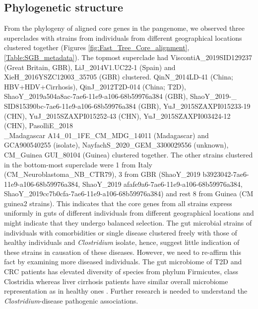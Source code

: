 \documentclass[11pt]{article}
\begin{document}
\subsection{Phylogenetic structure}
From the phylogeny of aligned core genes in the pangenome, we observed three superclades with strains from individuals from different geographical locations clustered together (Figures \ref{fig:Fast_Tree_Core_alignment},\ref{Table:SGB_metadata}). The topmost superclade had 
ViscontiA\_2019SID129237 (Great Britain, GBR), LiJ\_2014V1.UC22-1 (Spain) and XieH\_2016YSZC12003\_35705 (GBR) clustered. QinN\_2014LD-41 (China; HBV+HDV+Cirrhosis), QinJ\_2012T2D-014 (China; T2D), ShaoY\_2019a504a8ac-7ae6-11e9-a106-68b59976a384 (GBR), ShaoY\_2019-\_\\ SID815390bc-7ae6-11e9-a106-68b59976a384 (GBR), YuJ\_2015SZAXPI015233-19 (CHN), YuJ\_2015SZAXPI015252-43 (CHN), YuJ\_2015SZAXPI003424-12 (CHN), PasolliE\_2018\ \\ \_Madagascar      A14\_01\_1FE\_CM\_MDG\_14011 (Madagascar) and GCA900540255 (isolate), NayfachS\_2020\_GEM\_3300029556 (unknown), CM\_Guinea GUI\_80104 (Guinea) clustered together. The other strains clustered in the bottom-most superclade were 1 from Italy (CM\_Neuroblastoma\_NB\_CTR79), 3 from GBR (ShaoY\_2019 b3923042-7ae6-11e9-a106-68b59976a384, ShaoY\_2019 afafe9a6-7ae6-11e9-a106-68b59976a384, \\ ShaoY\_2019cc7b0cfa-7ae6-11e9-a106-68b59976a384) and rest 8 from Guinea (CM guinea2 strains). This indicates that the core genes from all strains express uniformly in guts of different individuals from different geographical locations and might indicate that they  undergo balanced selection. The gut microbial strains of individuals with comorbidities or single disease clustered freely with those of healthy individuals and \textit{Clostridium} isolate, hence, suggest little indication of these strains in causation of these diseases. However, we need to re-affirm this fact by examining more diseased individuals. The gut microbiome of T2D and CRC patients has elevated diversity of species from phylum Firmicutes, class Clostridia whereas liver cirrhosis patients have similar overall microbiome representation as in healthy ones \cite{Qin2012, Qin2014, Nayfach_2019, Armour2019}. Further research is needed to understand the \\ \textit{Clostridium}-disease pathogenic associations.\\
\end{document}
